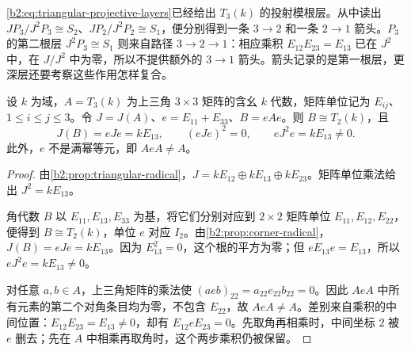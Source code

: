\eqref{b2:eq:triangular-projective-layers}已经给出 \(T_3(k)\) 的投射模根层。从中读出 \(JP_3/J^2P_3\cong S_2\)、\(JP_2/J^2P_2\cong S_1\)，便分别得到一条 \(3\to2\) 和一条 \(2\to1\) 箭头。\(P_3\) 的第二根层 \(J^2P_3\cong S_1\) 则来自路径 \(3\to2\to1\)：相应乘积 \(E_{12}E_{23}=E_{13}\) 已在 \(J^2\) 中，在 \(J/J^2\) 中为零，所以不提供额外的 \(3\to1\) 箭头。箭头记录的是第一根层，更深层还要考察这些作用怎样复合。

\begin{proposition}\label{b2:prop:nonfull-corner-radical-powers}
	设 \(k\) 为域，\(A=T_3(k)\) 为上三角 \(3\times3\) 矩阵的含幺 \(k\) 代数，矩阵单位记为 \(E_{ij}\)、\(1\le i\le j\le3\)。令 \(J=J(A)\)、\(e=E_{11}+E_{33}\)、\(B=eAe\)。则 \(B\cong T_2(k)\)，且
	\[
		J(B)=eJe=kE_{13},\qquad (eJe)^2=0,\qquad eJ^2e=kE_{13}\ne0.
	\]
	此外，\(e\) 不是满幂等元，即 \(AeA\ne A\)。
\end{proposition}
\begin{proof}
	由\cref{b2:prop:triangular-radical}，\(J=kE_{12}\oplus kE_{13}\oplus kE_{23}\)。矩阵单位乘法给出 \(J^2=kE_{13}\)。

	角代数 \(B\) 以 \(E_{11},E_{13},E_{33}\) 为基，将它们分别对应到 \(2\times2\) 矩阵单位 \(E_{11},E_{12},E_{22}\)，便得到 \(B\cong T_2(k)\)，单位 \(e\) 对应 \(I_2\)。由\cref{b2:prop:corner-radical}，\(J(B)=eJe=kE_{13}\)。因为 \(E_{13}^2=0\)，这个根的平方为零；但 \(eE_{13}e=E_{13}\)，所以 \(eJ^2e=kE_{13}\ne0\)。

	对任意 \(a,b\in A\)，上三角矩阵的乘法使 \((aeb)_{22}=a_{22}e_{22}b_{22}=0\)。因此 \(AeA\) 中所有元素的第二个对角条目均为零，不包含 \(E_{22}\)，故 \(AeA\ne A\)。差别来自乘积的中间位置：\(E_{12}E_{23}=E_{13}\ne0\)，却有 \(E_{12}eE_{23}=0\)。先取角再相乘时，中间坐标 \(2\) 被 \(e\) 删去；先在 \(A\) 中相乘再取角时，这个两步乘积仍被保留。
\end{proof}

